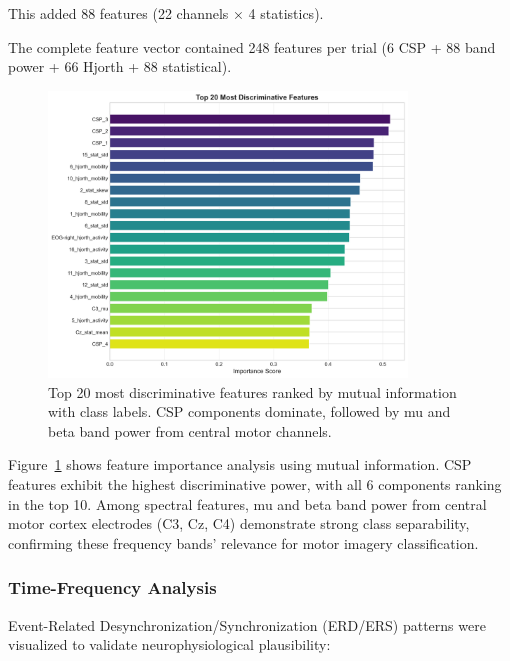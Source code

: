 \documentclass[11pt]{article}
\begin{document}
This added 88 features (22 channels × 4 statistics).

The complete feature vector contained 248 features per trial (6 CSP + 88 band power + 66 Hjorth + 88 statistical).

\begin{figure}[H]
    \centering
    \includegraphics[width=0.85\textwidth]{../results/figures/03_feature_importance_top20.png}
    \caption{Top 20 most discriminative features ranked by mutual information with class labels. CSP components dominate, followed by mu and beta band power from central motor channels.}
    \label{fig:feature_importance}
\end{figure}

Figure~\ref{fig:feature_importance} shows feature importance analysis using mutual information. CSP features exhibit the highest discriminative power, with all 6 components ranking in the top 10. Among spectral features, mu and beta band power from central motor cortex electrodes (C3, Cz, C4) demonstrate strong class separability, confirming these frequency bands' relevance for motor imagery classification.

\subsubsection{Time-Frequency Analysis}

Event-Related Desynchronization/Synchronization (ERD/ERS) patterns were visualized to validate neurophysiological plausibility:
\end{document}
